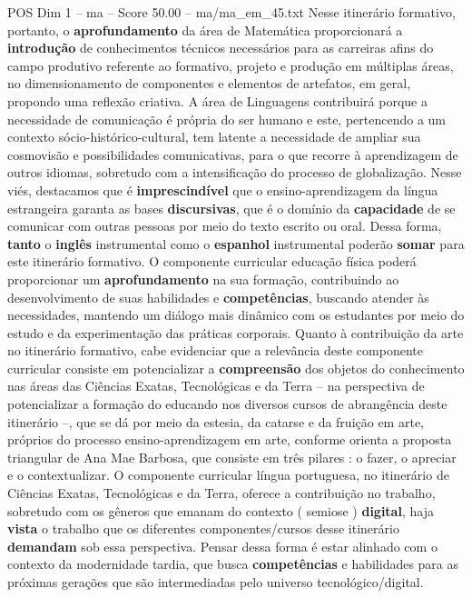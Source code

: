 \begin{textsample}{POS Dim 1 – ma – Score 50.00 – ma/ma\_em\_45.txt}
Nesse itinerário formativo, portanto, o \textbf{aprofundamento} da área de Matemática proporcionará a \textbf{introdução} de conhecimentos técnicos necessários para as carreiras afins do campo produtivo referente ao formativo, projeto e produção em múltiplas áreas, no dimensionamento de componentes e elementos de artefatos, em geral, propondo uma reflexão criativa.
A área de Linguagens contribuirá porque a necessidade de comunicação é própria do ser humano e este, pertencendo a um contexto sócio-histórico-cultural, tem latente a necessidade de ampliar sua cosmovisão e possibilidades comunicativas, para o que recorre à aprendizagem de outros idiomas, sobretudo com a intensificação do processo de globalização.
Nesse viés, destacamos que é \textbf{imprescindível} que o ensino-aprendizagem da língua estrangeira garanta as bases \textbf{discursivas}, que é o domínio da \textbf{capacidade} de se comunicar com outras pessoas por meio do texto escrito ou oral.
Dessa forma, \textbf{tanto} o \textbf{inglês} instrumental como o \textbf{espanhol} instrumental poderão \textbf{somar} para este itinerário formativo.
O componente curricular educação física poderá proporcionar um \textbf{aprofundamento} na sua formação, contribuindo ao desenvolvimento de suas habilidades e \textbf{competências}, buscando atender às necessidades, mantendo um diálogo mais dinâmico com os estudantes por meio do estudo e da experimentação das práticas corporais.
Quanto à contribuição da arte no itinerário formativo, cabe evidenciar que a relevância deste componente curricular consiste em potencializar a \textbf{compreensão} dos objetos do conhecimento nas áreas das Ciências Exatas, Tecnológicas e da Terra – na perspectiva de potencializar a formação do educando nos diversos cursos de abrangência deste itinerário –, que se dá por meio da estesia, da catarse e da fruição em arte, próprios do processo ensino-aprendizagem em arte, conforme orienta a proposta triangular de Ana Mae Barbosa, que consiste em três pilares : o fazer, o apreciar e o contextualizar.
O componente curricular língua portuguesa, no itinerário de Ciências Exatas, Tecnológicas e da Terra, oferece a contribuição no trabalho, sobretudo com os gêneros que emanam do contexto ( semiose ) \textbf{digital}, haja \textbf{vista} o trabalho que os diferentes componentes/cursos desse itinerário \textbf{demandam} sob essa perspectiva.
Pensar dessa forma é estar alinhado com o contexto da modernidade tardia, que busca \textbf{competências} e habilidades para as próximas gerações que são intermediadas pelo universo tecnológico/digital.

\end{textsample}
